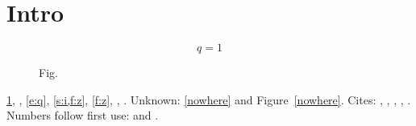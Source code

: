 \documentclass{article}
\begin{document}
\section{Intro}\label{s:i}
\begin{equation}\label{e:q} q = 1 \end{equation}
\begin{figure}\caption{Fig.}\label{f:z}\end{figure}
\cref{s:i}, , \cref{e:q}, \cref{s:i,f:z}, \autoref{f:z}, , \pageref{s:i}.
Unknown: \ref{nowhere} and Figure~\ref{nowhere}.
Cites: \cite{a}, \citep{a,b}, \citet{c}, \citep[see][p.~3]{d}, \citealp{a,e}.
Numbers follow first use: \cite{e} and \cite{a}.


\end{document}
